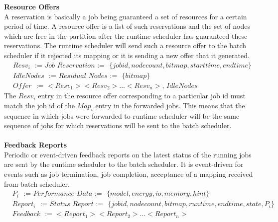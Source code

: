 \textbf{Resource Offers}\\
A reservation is basically a job being guaranteed a set of resources for a certain period of time. A resource offer is a list of such reservations and the set of nodes which are free in the partition after the runtime scheduler has guaranteed these reservations. The runtime scheduler will send such a resource offer to the batch scheduler if it rejected its mapping or it is sending a new offer that it generated.\\
\begin{equation*}
\begin{aligned}
&Resv_{i}\ \ \ \textit{:=\ \ \ Job Reservation\ \ \ :=}\ \ \ \{jobid,node count,bitmap,start time,end time\}\\
&IdleNodes\ \ \ \textit{:=\ \ \ Residual Nodes\ \ \ :=}\ \ \ \{bitmap\}\\
&Offer\ \ \ \textit{:=\ \ \ $<Resv_{1}><Resv_{2}>...<Resv_{n}>$,\ IdleNodes}
\end{aligned}
\end{equation*}
The \textbf{\textit{$Resv_{i}$}} entry in the resource offer corresponding to a particular job id must match the job id of the \textbf{\textit{$Map_{i}$}} entry in the forwarded jobs. This means that the sequence in which jobs were forwarded to runtime scheduler will be the same sequence of jobs for which reservations will be sent to the batch scheduler.\\ \\
\textbf{Feedback Reports}\\
Periodic or event-driven feedback reports on the latest status of the running jobs are sent by the runtime scheduler to the batch scheduler. It is event-driven for events such as job termination, job completion, acceptance of a mapping received from batch scheduler.
\begin{equation*}
\begin{aligned}
&P_{i}\ \ \ \textit{:=\ \ \ Performance Data\ \ \ :=}\ \ \ \{model,energy,io,memory,hint\}\\
&Report_{i}\ \ \ \textit{:=\ \ \ Status Report\ \ \ :=}\ \ \ \{jobid,node count,bitmap,run time,end time,state,P_{i}\}\\
&Feedback\ \ \ \textit{:=\ \ \ $<Report_{1}><Report_{2}>...<Report_{n}>$}
\end{aligned}
\end{equation*}
